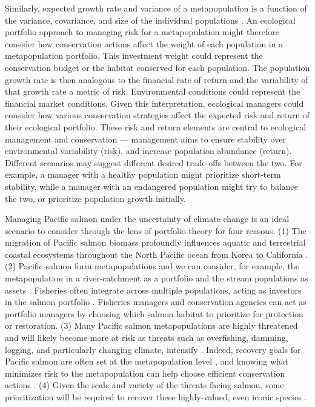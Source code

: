 \documentclass[12pt,english]{article}
\begin{document}
\begin{spacing}{1.9}
Similarly, expected growth rate and variance of a metapopulation is a function of the variance, covariance, and size of the individual populations \citep{moore2010, carlson2011, anderson2013}. An ecological portfolio approach to managing risk for a metapopulation might therefore consider how conservation actions affect the weight of each population in a metapopulation portfolio. This investment weight could represent the conservation budget or the habitat conserved for each population. The population growth rate is then analogous to the financial rate of return and the variability of that growth rate a metric of risk. Environmental conditions could represent the financial market conditions. Given this interpretation, ecological managers could consider how various conservation strategies affect the expected risk and return of their ecological portfolio. These risk and return elements are central to ecological management and conservation --- management aims to ensure stability over environmental variability (risk), and increase population abundance (return). Different scenarios may suggest different desired trade-offs between the two. For example, a manager with a healthy population might prioritize short-term stability, while a manager with an endangered population might try to balance the two, or prioritize population growth initially.

Managing Pacific salmon under the uncertainty of climate change is an ideal scenario to consider through the lens of portfolio theory for four reasons. (1) The migration of Pacific salmon biomass profoundly influences aquatic and terrestrial coastal ecosystems throughout the North Pacific ocean from Korea to California \citep{quinn2005}. (2) Pacific salmon form metapopulations \citep[e.g.][]{policansky1998, cooper1999, schtickzelle2007} and we can consider, for example, the metapopulation in a river-catchment as a portfolio and the stream populations as assets \citep{schindler2010, moore2010, carlson2011, anderson2013, yeakel2014}. Fisheries often integrate across multiple populations, acting as investors in the salmon portfolio \citep{hilborn2003}. Fisheries managers and conservation agencies can act as portfolio managers by choosing which salmon habitat to prioritize for protection or restoration. (3) Many Pacific salmon metapopulations are highly threatened \citep[e.g.][]{gustafson2007} and will likely become more at risk as threats such as overfishing, damming, logging, and particularly changing climate, intensify \citep[e.g.][]{lackey2003}. Indeed, recovery goals for Pacific salmon are often set at the metapopulation level \citep{mcelhany2000}, and knowing what minimizes risk to the metapopulation can help choose efficient conservation actions \citep{policansky1998, mcelhany2000}. (4) Given the scale and variety of the threats facing salmon, some prioritization will be required to recover these highly-valued, even iconic species \citep{allendorf1997, ruckelshaus2002}.


\end{spacing}
\end{document}
